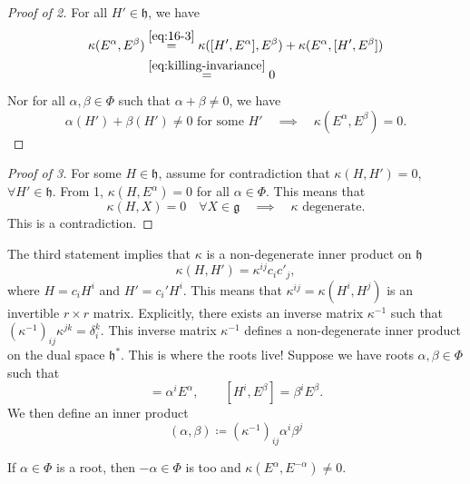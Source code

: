 \begin{proof}[Proof of 2]
  For all $H' \in \mathfrak{h}$, we have
  \begin{align}
    [\alpha(H') + \beta(H')] \kappa(E^{\alpha}, E^{\beta}) &\stackrel{\eqref{eq:16-3}}{=} \kappa([H', E^{\alpha}], E^{\beta}) + \kappa(E^{\alpha}, [H', E^{\beta}]) \\
							   &\stackrel{\eqref{eq:killing-invariance}}{=} 0
  \end{align}
  Nor for all $\alpha,\beta \in \Phi$ such that $\alpha + \beta \neq 0$, we have 
  \begin{equation}
    \alpha(H') + \beta(H') \neq 0 \text{ for some } H' \quad \implies \quad \kappa(E^{\alpha}, E^{\beta}) = 0.
  \end{equation}
\end{proof}
\begin{proof}[Proof of 3]
  For some $H \in \mathfrak{h}$, assume for contradiction that $\kappa(H, H') = 0$, $\forall H' \in \mathfrak{h}$. From 1, $\kappa(H, E^{\alpha}) = 0$ for all $\alpha \in \Phi$. This means that
  \begin{equation}
    \kappa(H, X) = 0 \quad \forall X \in \mathfrak{g} \quad \implies \quad \kappa \text{ degenerate}.
  \end{equation}
  This is a contradiction.
\end{proof}
The third statement implies that $\kappa$ is a non-degenerate inner product on $\mathfrak{h}$
\begin{equation}
  \kappa(H, H') = \kappa^{ij} c_{i} c'_{j},
\end{equation}
where $H = c_{i} H^{i}$ and $H' = c_{i}' H^{i}$.
This means that $\kappa^{ij} = \kappa(H^{i}, H^{j})$ is an invertible $r \times r$ matrix. Explicitly, there exists an inverse matrix $\kappa^{-1}$ such that $(\kappa^{-1})_{ij} \kappa^{jk} = \delta^{k}_{i}$.
This inverse matrix $\kappa^{-1}$ defines a non-degenerate inner product on the dual space $\mathfrak{h}^*$.
This is where the roots live! Suppose we have roots $\alpha, \beta \in \Phi$ such that
\begin{equation}
  [H^{i}, E^{\alpha}] = \alpha^{i} E^{\alpha}, \qquad [H^{i}, E^{\beta}] = \beta^{i} E^{\beta}.
\end{equation}
We then define an inner product
\begin{equation}
  \label{eq:16-6}
  \boxed{(\alpha, \beta) \coloneqq (\kappa^{-1})_{ij} \alpha^{i} \beta^{j}}
\end{equation}
\begin{claim} \label{claim:16-inverse-root-is-root}
  If $\alpha \in \Phi$ is a root, then $-\alpha \in \Phi$ is too and $\kappa(E^{\alpha}, E^{-\alpha}) \neq 0$.
\end{claim}
